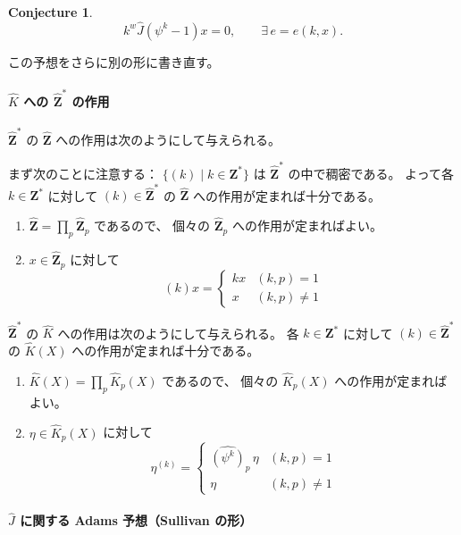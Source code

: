 \documentclass[uplatex,dvipdfmx,a4paper,12pt]{jlreq}
\newtheorem{conjecture}[theorem]{Conjecture}
\newcommand{\Z}{\mathbf{Z}}
\begin{document}
\begin{conjecture}
  \[
    k^w \hat{J}(\psi^k - 1)x = 0, \qquad \exists\, e = e(k, x).
  \]
\end{conjecture}

この予想をさらに別の形に書き直す。

\paragraph{$\hat{K}$ への $\hat{\Z}^*$ の作用}

$\hat{\Z}^*$ の $\hat{\Z}$ への作用は次のようにして与えられる。

まず次のことに注意する：
$\{(k) \mid k \in \Z^*\}$ は $\hat{\Z}^*$ の中で稠密である。
よって各 $k \in \Z^*$ に対して $(k) \in \hat{\Z}^*$ の $\hat{\Z}$ への作用が定まれば十分である。

\begin{enumerate}
  \item $\hat{\Z} = \prod_p \hat{\Z}_p$ であるので、
        個々の $\hat{\Z}_p$ への作用が定まればよい。
  \item $x \in \hat{\Z}_p$ に対して
        \[
          (k)x = \begin{cases}
            kx & (k, p) = 1 \\
            x  & (k, p) \neq 1
          \end{cases}
        \]
\end{enumerate}

$\hat{\Z}^*$ の $\hat{K}$ への作用は次のようにして与えられる。
各 $k \in \Z^*$ に対して $(k) \in \hat{\Z}^*$ の $\hat{K}(X)$ への作用が定まれば十分である。

\begin{enumerate}
  \item $\hat{K}(X) = \prod_p \hat{K}_p(X)$ であるので、
        個々の $\hat{K}_p(X)$ への作用が定まればよい。
  \item $\eta \in \hat{K}_p(X)$ に対して
        \[
          \eta^{(k)} = \begin{cases}
            \widehat{(\psi^k)}_p\, \eta & (k, p) = 1 \\
            \eta                        & (k, p) \neq 1
          \end{cases}
        \]
\end{enumerate}

\paragraph{$\hat{J}$ に関する Adams 予想（Sullivan の形）}
\end{document}
